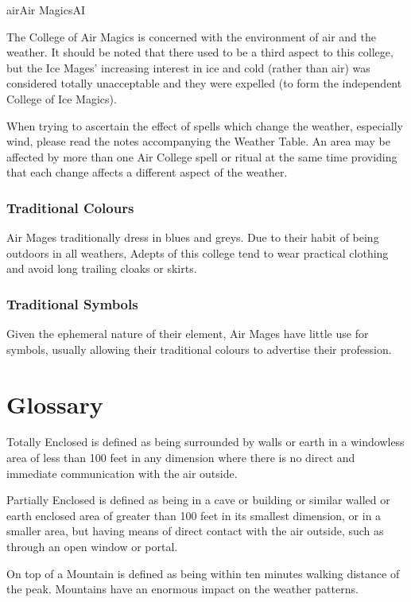 \begin{College}[2.1]{air}{Air Magics}{AI}

The College of Air Magics is concerned with the environment of air and
the weather.  It should be noted that there used to be a third aspect
to this college, but the Ice Mages’ increasing interest in ice and
cold (rather than air) was considered totally unacceptable and they
were expelled (to form the independent College of Ice Magics).

When trying to ascertain the effect of spells which change the
weather, especially wind, please read the notes accompanying the
Weather Table.  An area may be affected by more than one Air College
spell or ritual at the same time providing that each change affects a
different aspect of the weather.

\subsubsection{Traditional Colours}

Air Mages traditionally dress in blues and greys.  Due to their habit
of being outdoors in all weathers, Adepts of this college tend to wear
practical clothing and avoid long trailing cloaks or skirts.

\subsubsection{Traditional Symbols}

Given the ephemeral nature of their element, Air Mages have little use
for symbols, usually allowing their traditional colours to advertise
their profession.

\section{Glossary}

Totally Enclosed is defined as being surrounded by walls or earth in a
windowless area of less than 100 feet in any dimension where there is
no direct and immediate communication with the air outside.

Partially Enclosed is defined as being in a cave or building or
similar walled or earth enclosed area of greater than 100 feet in its
smallest dimension, or in a smaller area, but having means of direct
contact with the air outside, such as through an open window or
portal.

On top of a Mountain is defined as being within ten 
minutes  walking  distance  of  the  peak.  Mountains 
have an enormous impact on the weather patterns. 


\end{College}
